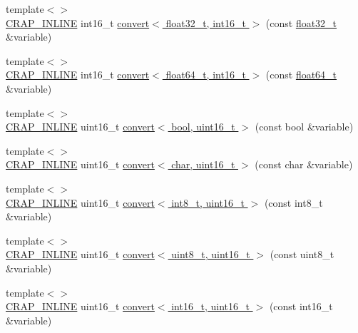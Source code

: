 \begin{DoxyCompactItemize}
\item 
{\footnotesize template$<$$>$ }\\\hyperlink{config__x86_8h_a5a40526b8d842e7ff731509998bb0f1c}{C\+R\+A\+P\+\_\+\+I\+N\+L\+I\+N\+E} int16\+\_\+t \hyperlink{namespacecrap_a4ffb2cfbad8923e9f3a6a51dbe14d419}{convert$<$ float32\+\_\+t, int16\+\_\+t $>$} (const \hyperlink{crap__types_8h_a4611b605e45ab401f02cab15c5e38715}{float32\+\_\+t} \&variable)
\item 
{\footnotesize template$<$$>$ }\\\hyperlink{config__x86_8h_a5a40526b8d842e7ff731509998bb0f1c}{C\+R\+A\+P\+\_\+\+I\+N\+L\+I\+N\+E} int16\+\_\+t \hyperlink{namespacecrap_a3c066eb962b08c6804e02cfb1b4e92a2}{convert$<$ float64\+\_\+t, int16\+\_\+t $>$} (const \hyperlink{crap__types_8h_ac55f3ae81b5bc9053760baacf57e47f4}{float64\+\_\+t} \&variable)
\item 
{\footnotesize template$<$$>$ }\\\hyperlink{config__x86_8h_a5a40526b8d842e7ff731509998bb0f1c}{C\+R\+A\+P\+\_\+\+I\+N\+L\+I\+N\+E} uint16\+\_\+t \hyperlink{namespacecrap_a781120aa4294dbb8d3bae62323f510e0}{convert$<$ bool, uint16\+\_\+t $>$} (const bool \&variable)
\item 
{\footnotesize template$<$$>$ }\\\hyperlink{config__x86_8h_a5a40526b8d842e7ff731509998bb0f1c}{C\+R\+A\+P\+\_\+\+I\+N\+L\+I\+N\+E} uint16\+\_\+t \hyperlink{namespacecrap_a0b54061f73e4522f3078723312110027}{convert$<$ char, uint16\+\_\+t $>$} (const char \&variable)
\item 
{\footnotesize template$<$$>$ }\\\hyperlink{config__x86_8h_a5a40526b8d842e7ff731509998bb0f1c}{C\+R\+A\+P\+\_\+\+I\+N\+L\+I\+N\+E} uint16\+\_\+t \hyperlink{namespacecrap_a57a79d60b4394c744fd152b23f89c1f0}{convert$<$ int8\+\_\+t, uint16\+\_\+t $>$} (const int8\+\_\+t \&variable)
\item 
{\footnotesize template$<$$>$ }\\\hyperlink{config__x86_8h_a5a40526b8d842e7ff731509998bb0f1c}{C\+R\+A\+P\+\_\+\+I\+N\+L\+I\+N\+E} uint16\+\_\+t \hyperlink{namespacecrap_acdffcf565cf59f4059ec1b72844da223}{convert$<$ uint8\+\_\+t, uint16\+\_\+t $>$} (const uint8\+\_\+t \&variable)
\item 
{\footnotesize template$<$$>$ }\\\hyperlink{config__x86_8h_a5a40526b8d842e7ff731509998bb0f1c}{C\+R\+A\+P\+\_\+\+I\+N\+L\+I\+N\+E} uint16\+\_\+t \hyperlink{namespacecrap_a73d8bd062bf34ce1027dde7ef1e7a8c6}{convert$<$ int16\+\_\+t, uint16\+\_\+t $>$} (const int16\+\_\+t \&variable)

\end{DoxyCompactItemize}
